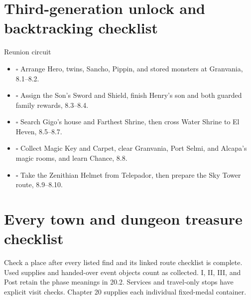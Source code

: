 \section{Third-generation unlock and backtracking checklist}

\begin{routecheck}[breakable=false]{Reunion circuit}
\begin{itemize}
\item \(\square\) Arrange Hero, twins, Sancho, Pippin, and stored monsters at Granvania, 8.1--8.2.
\item \(\square\) Assign the Son's Sword and Shield, finish Henry's son and both guarded family rewards, 8.3--8.4.
\item \(\square\) Search Gigo's house and Farthest Shrine, then cross Water Shrine to El Heven, 8.5--8.7.
\item \(\square\) Collect Magic Key and Carpet, clear Granvania, Port Selmi, and Alcapa's magic rooms, and learn Chance, 8.8.
\item \(\square\) Take the Zenithian Helmet from Telepador, then prepare the Sky Tower route, 8.9--8.10.
\end{itemize}
\end{routecheck}

\section{Every town and dungeon treasure checklist}
\label{completion-treasures}

Check a place after every listed find and its linked route checklist is
complete. Used supplies and handed-over event objects count as collected.
I, II, III, and Post retain the phase meanings in 20.2. Services and
travel-only stops have explicit visit checks. Chapter 20 supplies each
individual fixed-medal container.

